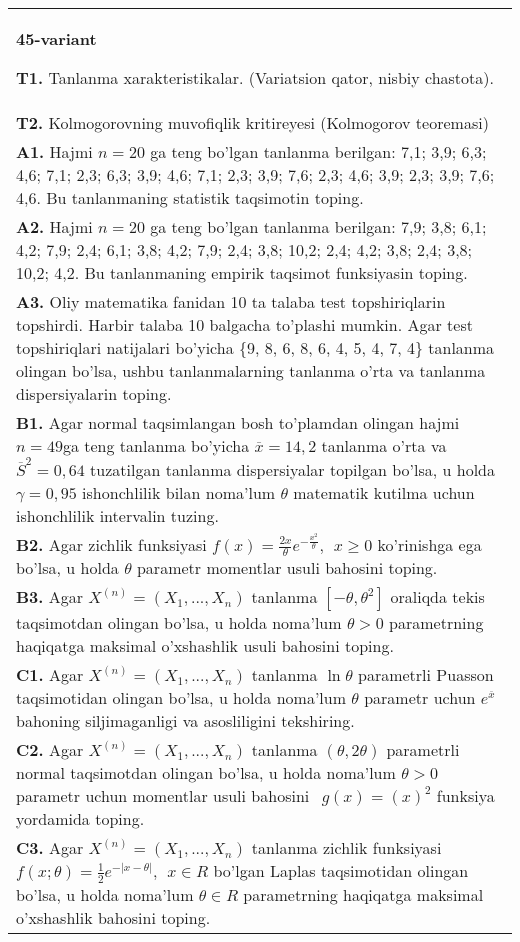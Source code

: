 \documentclass{article}
\begin{document}
\begin{tabular}{m{17cm}}
\textbf{45-variant}
\newline

\textbf{T1.} 
Tanlanma xarakteristikalar. (Variatsion qator, nisbiy chastota).
\\
\textbf{T2.} 
Kolmogorovning muvofiqlik kritireyesi (Kolmogorov teoremasi)
\\
\textbf{A1.} 
Hajmi \(n = 20\) ga teng bo'lgan tanlanma berilgan: 7,1; 3,9; 6,3; 4,6; 7,1; 2,3; 6,3; 3,9; 4,6; 7,1; 2,3; 3,9; 7,6; 2,3; 4,6; 3,9; 2,3; 3,9; 7,6; 4,6. Bu tanlanmaning statistik taqsimotin toping.
\\
\textbf{A2.} 
Hajmi \(n = 20\) ga teng bo'lgan tanlanma berilgan: 7,9; 3,8; 6,1; 4,2; 7,9; 2,4; 6,1; 3,8; 4,2; 7,9; 2,4; 3,8; 10,2; 2,4; 4,2; 3,8; 2,4; 3,8; 10,2; 4,2. Bu tanlanmaning empirik taqsimot funksiyasin toping.
\\
\textbf{A3.} 
Oliy matematika fanidan 10 ta talaba test topshiriqlarin topshirdi. Harbir talaba 10 balgacha to'plashi mumkin. Agar test topshiriqlari natijalari bo'yicha \{9, 8, 6, 8, 6, 4, 5, 4, 7, 4\} tanlanma olingan bo'lsa, ushbu tanlanmalarning tanlanma o'rta va tanlanma dispersiyalarin toping.
\\
\textbf{B1.} 
Agar normal taqsimlangan bosh to'plamdan olingan hajmi \(n = 49\)ga teng tanlanma bo'yicha \(\overline{x} = 14,2\) tanlanma o'rta va \({\overline{S}}^{2} = 0,64\) tuzatilgan tanlanma dispersiyalar topilgan bo'lsa, u holda \(\gamma = 0,95\) ishonchlilik bilan noma'lum \(\theta\) matematik kutilma uchun ishonchlilik intervalin tuzing.
\\
\textbf{B2.} 
Agar zichlik funksiyasi \(f(x) = \frac{2x}{\theta}e^{- \frac{x^{2}}{\theta}},\ \ x \geq 0\) ko'rinishga ega bo'lsa, u holda \(\theta\) parametr momentlar usuli bahosini toping.
\\
\textbf{B3.} 
Agar \(X^{(n)} = \left( X_{1},...,X_{n} \right)\) tanlanma \(\left\lbrack - \theta,\theta^{2} \right\rbrack\) oraliqda tekis taqsimotdan olingan bo'lsa, u holda noma'lum \(\theta > 0\) parametrning haqiqatga maksimal o'xshashlik usuli bahosini toping.
\\
\textbf{C1.} 
Agar \(X^{(n)} = \left( X_{1},...,X_{n} \right)\) tanlanma \(\ln\theta\) parametrli Puasson taqsimotidan olingan bo'lsa, u holda noma'lum \(\theta\) parametr uchun \(e^{\overline{x}}\) bahoning siljimaganligi va asosliligini tekshiring.
\\
\textbf{C2.} 
Agar \(X^{(n)} = \left( X_{1},...,X_{n} \right)\) tanlanma \((\theta,2\theta)\) parametrli normal taqsimotdan olingan bo'lsa, u holda noma'lum \(\theta > 0\) parametr uchun momentlar usuli bahosini \(\ \ g(x) = (x)^{2}\) funksiya yordamida toping.
\\
\textbf{C3.} 
Agar \(X^{(n)} = \left( X_{1},...,X_{n} \right)\) tanlanma zichlik funksiyasi\(f(x;\theta) = \frac{1}{2}e^{- |x - \theta|},\ \ x \in R\) bo'lgan Laplas taqsimotidan olingan bo'lsa, u holda noma'lum \(\theta \in R\) parametrning haqiqatga maksimal o'xshashlik bahosini toping.
\\

\end{tabular}
\vspace{1cm}
\end{document}
